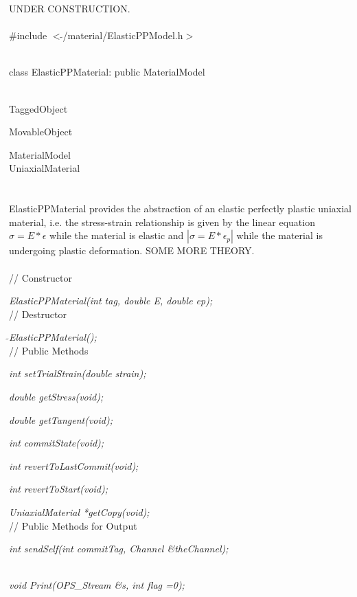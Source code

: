 
UNDER CONSTRUCTION. \\

   \\
\#include $<\tilde{ }$/material/ElasticPPModel.h$>$  


  \\
class ElasticPPMaterial: public MaterialModel 


 \\
TaggedObject 

MovableObject 

\indent\indent MaterialModel \\
\indent\indent\indent UniaxialMaterial \\
\indent\indent\indent{} \\

  \\
\indent ElasticPPMaterial provides the abstraction of an elastic
perfectly plastic uniaxial material, i.e. the stress-strain
relationship is given by the linear equation $\sigma = E * \epsilon$
while the material is elastic and $| \sigma = E * \epsilon_p |$  while
the material is undergoing plastic deformation. SOME MORE THEORY. \\

 \\
// Constructor 

{\em ElasticPPMaterial(int tag, double E, double ep);}  \\ 

// Destructor 

{\em $\tilde{ }$ElasticPPMaterial();}\\ 

// Public Methods 

{\em int setTrialStrain(double strain); } 

{\em double getStress(void); } 

{\em double getTangent(void); } 

{\em int commitState(void); } 

{\em int revertToLastCommit(void); } 

{\em int revertToStart(void); } 

{\em UniaxialMaterial *getCopy(void); } \\ 

// Public Methods for Output

{\em    int sendSelf(int commitTag, Channel \&theChannel); }

\\
{\em    void Print(OPS_Stream \&s, int flag =0);} 


